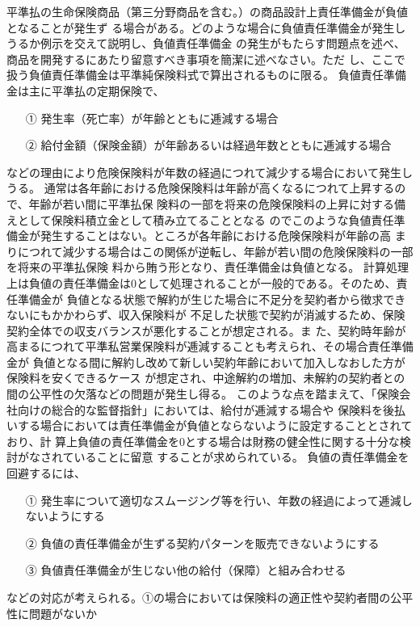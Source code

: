 \documentclass[report,gutter=10mm,fore-edge=10mm,uplatex,dvipdfmx]{jlreq}
\begin{document}
平準払の生命保険商品（第三分野商品を含む。）の商品設計上責任準備金が負値となることが発生ず
る場合がある。どのような場合に負値責任準備金が発生しうるか例示を交えて説明し、負値責任準備金
の発生がもたらす問題点を述べ、商品を開発するにあたり留意すべき事項を簡潔に述べなさい。ただ
し、ここで扱う負値責任準備金は平準純保険料式で算出されるものに限る。
負値責任準備金は主に平準払の定期保険で、
\begin{itemize}
 \item [①]発生率（死亡率）が年齢とともに逓減する場合
 \item [②]給付金額（保険金額）が年齢あるいは経過年数とともに逓減する場合
\end{itemize}
などの理由により危険保険料が年数の経過につれて減少する場合において発生しうる。
通常は各年齢における危険保険料は年齢が高くなるにつれて上昇するので、年齢が若い間に平準払保
険料の一部を将来の危険保険料の上昇に対する備えとして保険料積立金として積み立てることとなる
のでこのような負値責任準備金が発生することはない。ところが各年齢における危険保険料が年齢の高
まりにつれて減少する場合はこの関係が逆転し、年齢が若い間の危険保険料の一部を将来の平準払保険
料から賄う形となり、責任準備金は負値となる。
計算処理上は負値の責任準備金は0として処理されることが一般的である。そのため、責任準備金が
負値となる状態で解約が生じた場合に不足分を契約者から徴求できないにもかかわらず、収入保険料が
不足した状態で契約が消滅するため、保険契約全体での収支バランスが悪化することが想定される。ま
た、契約時年齢が高まるにつれて平準私営業保険料が逓減することも考えられ、その場合責任準備金が
負値となる間に解約し改めて新しい契約年齢において加入しなおした方が保険料を安くできるケース
が想定され、中途解約の増加、未解約の契約者との間の公平性の欠落などの問題が発生し得る。
このような点を踏まえて、「保険会社向けの総合的な監督指針」においては、給付が逓減する場合や
保険料を後払いする場合においては責任準備金が負値とならないように設定することとされており、計
算上負値の責任準備金を0とする場合は財務の健全性に関する十分な検討がなされていることに留意
することが求められている。
負値の責任準備金を回避するには、
\begin{itemize}
 \item [①]発生率について適切なスムージング等を行い、年数の経過によって逓減しないようにする
 \item [②]負値の責任準備金が生ずる契約パターンを販売できないようにする
 \item [③]負値責任準備金が生じない他の給付（保障）と組み合わせる
\end{itemize}
などの対応が考えられる。①の場合においては保険料の適正性や契約者間の公平性に問題がないか
\end{document}
